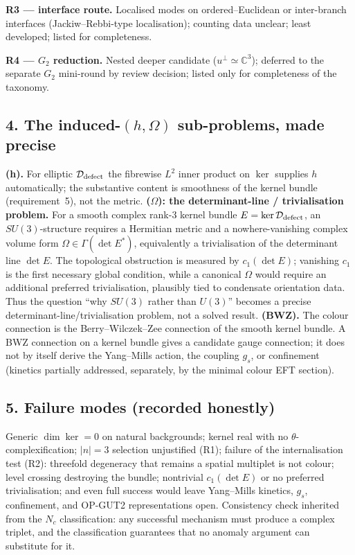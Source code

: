 \textbf{R3 --- interface route.}
Localised modes on ordered--Euclidean or inter-branch interfaces
(Jackiw--Rebbi-type localisation); counting data unclear; least
developed; listed for completeness.

\textbf{R4 --- $G_2$ reduction.}
Nested deeper candidate ($u^\perp\simeq\mathbb C^3$); deferred to
the separate $G_2$ mini-round by review decision; listed only for
completeness of the taxonomy.

\subsection*{4. The induced-$(h,\Omega)$ sub-problems, made
precise}
\textbf{(h).}
For elliptic $\mathcal D_{\rm defect}$ the fibrewise $L^2$ inner
product on $\ker$ supplies $h$ automatically; the substantive
content is smoothness of the kernel bundle (requirement~5), not
the metric.
\textbf{($\Omega$): the determinant-line / trivialisation
problem.}
For a smooth complex rank-3 kernel bundle
$E=\ker\mathcal D_{\rm defect}$, an $SU(3)$-structure requires a
Hermitian metric and a nowhere-vanishing complex volume form
$\Omega\in\Gamma(\det E^*)$, equivalently a trivialisation of the
determinant line $\det E$.
The topological obstruction is measured by $c_1(\det E)$;
vanishing $c_1$ is the first necessary global condition, while a
canonical $\Omega$ would require an additional preferred
trivialisation, plausibly tied to condensate orientation data.
Thus the question ``why $SU(3)$ rather than $U(3)$'' becomes a
precise determinant-line/trivialisation problem, not a solved
result.
\textbf{(BWZ).}
The colour connection is the Berry--Wilczek--Zee connection of the
smooth kernel bundle.
A BWZ connection on a kernel bundle gives a candidate gauge
connection; it does not by itself derive the Yang--Mills action,
the coupling $g_s$, or confinement (kinetics partially addressed,
separately, by the minimal colour EFT section).

\subsection*{5. Failure modes (recorded honestly)}
Generic $\dim\ker=0$ on natural backgrounds; kernel real with no
$\theta$-complexification; $|n|=3$ selection unjustified (R1);
failure of the internalisation test (R2): threefold degeneracy
that remains a spatial multiplet is not colour; level crossing
destroying the bundle; nontrivial $c_1(\det E)$ or no preferred
trivialisation; and even full success would leave Yang--Mills
kinetics, $g_s$, confinement, and OP-GUT2 representations open.
Consistency check inherited from the $N_c$ classification: any
successful mechanism must produce a complex triplet, and the
classification guarantees that no anomaly argument can substitute
for it.

